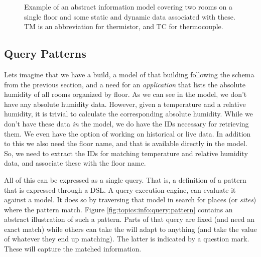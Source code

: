 \begin{figure}[tbp]
  \begin{center}
  \end{center}
  \caption[Example of an abstract information model]{Example of an abstract information model covering two rooms on a single floor and some static and dynamic data associated with these. TM is an abbreviation for thermistor, and TC for thermocouple.}
  \label{fig:topics:info:model}
\end{figure}

\subsection{Query Patterns}

Lets imagine that we have a build, a model of that building following the schema from the previous section, and a need for an \textsl{application} that lists the absolute humidity of all rooms organized by floor. As we can see in the model, we don't have any absolute humidity data. However, given a temperature and a relative humidity, it is trivial to calculate the corresponding absolute humidity. While we don't have these data \textsl{in} the model, we do have the IDs necessary for retrieving them. We even have the option of working on historical or live data. In addition to this we also need the floor name, and that is available directly in the model. So, we need to extract the IDs for matching temperature and relative humidity data, and associate these with the floor name.

All of this can be expressed as a single query. That is, a definition of a pattern that is expressed through a DSL. A query execution engine, can evaluate it against a model. It does so by traversing that model in search for places (or \textsl{sites}) where the pattern match. Figure \ref{fig:topics:info:query:pattern} contains an abstract illustration of such a pattern. Parts of that query are fixed (and need an exact match) while others can take the will adapt to anything (and take the value of whatever they end up matching). The latter is indicated by a question mark. These will capture the matched information.

